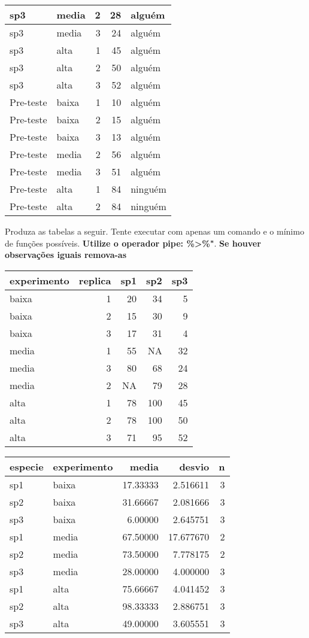 \documentclass[]{book}
\begin{document}
\begin{tabular}{l|l|r|r|l}
\hline
sp3 & media & 2 & 28 & alguém\\
\hline
sp3 & media & 3 & 24 & alguém\\
\hline
sp3 & alta & 1 & 45 & alguém\\
\hline
sp3 & alta & 2 & 50 & alguém\\
\hline
sp3 & alta & 3 & 52 & alguém\\
\hline
Pre-teste & baixa & 1 & 10 & alguém\\
\hline
Pre-teste & baixa & 2 & 15 & alguém\\
\hline
Pre-teste & baixa & 3 & 13 & alguém\\
\hline
Pre-teste & media & 2 & 56 & alguém\\
\hline
Pre-teste & media & 3 & 51 & alguém\\
\hline
Pre-teste & alta & 1 & 84 & ninguém\\
\hline
Pre-teste & alta & 2 & 84 & ninguém\\
\hline
\end{tabular}

Produza as tabelas a seguir. Tente executar com apenas um comando e o mínimo de funções possíveis. \textbf{Utilize o operador pipe: \%\textgreater{}\%"}. \textbf{Se houver observações iguais remova-as}

\begin{tabular}{l|r|r|r|r}
\hline
experimento & replica & sp1 & sp2 & sp3\\
\hline
baixa & 1 & 20 & 34 & 5\\
\hline
baixa & 2 & 15 & 30 & 9\\
\hline
baixa & 3 & 17 & 31 & 4\\
\hline
media & 1 & 55 & NA & 32\\
\hline
media & 3 & 80 & 68 & 24\\
\hline
media & 2 & NA & 79 & 28\\
\hline
alta & 1 & 78 & 100 & 45\\
\hline
alta & 2 & 78 & 100 & 50\\
\hline
alta & 3 & 71 & 95 & 52\\
\hline
\end{tabular}

\begin{tabular}{l|l|r|r|r}
\hline
especie & experimento & media & desvio & n\\
\hline
sp1 & baixa & 17.33333 & 2.516611 & 3\\
\hline
sp2 & baixa & 31.66667 & 2.081666 & 3\\
\hline
sp3 & baixa & 6.00000 & 2.645751 & 3\\
\hline
sp1 & media & 67.50000 & 17.677670 & 2\\
\hline
sp2 & media & 73.50000 & 7.778175 & 2\\
\hline
sp3 & media & 28.00000 & 4.000000 & 3\\
\hline
sp1 & alta & 75.66667 & 4.041452 & 3\\
\hline
sp2 & alta & 98.33333 & 2.886751 & 3\\
\hline
sp3 & alta & 49.00000 & 3.605551 & 3\\
\hline
\end{tabular}
\end{document}
